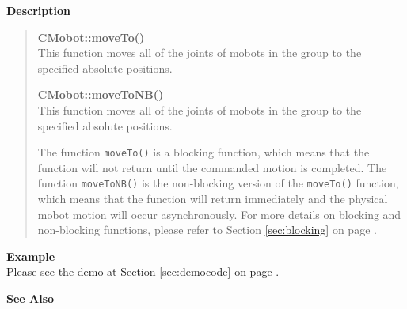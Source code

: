 \noindent
{\bf Description}\\
\vspace{-12pt}
\begin{quote}
{\bf CMobot::moveTo()}\\
This function moves all of the joints of mobots in the group to the specified absolute positions. 

{\bf CMobot::moveToNB()}\\
This function moves all of the joints of mobots in the group to the specified absolute positions. 

The function \texttt{moveTo()} is a blocking function, which means that 
the function will not return until the commanded motion is 
completed. The function \texttt{moveToNB()} is the non-blocking version of
the \texttt{moveTo()} function, which means that the function will return
immediately and the physical mobot motion will occur asynchronously. For
more details on blocking and non-blocking functions, please refer to 
Section \ref{sec:blocking} on page \pageref{sec:blocking}.\\
\end{quote}

\noindent
{\bf Example}\\
Please see the demo at Section \ref{sec:democode} on page \pageref{sec:democode}.\\
\noindent

\noindent
{\bf See Also}\\


